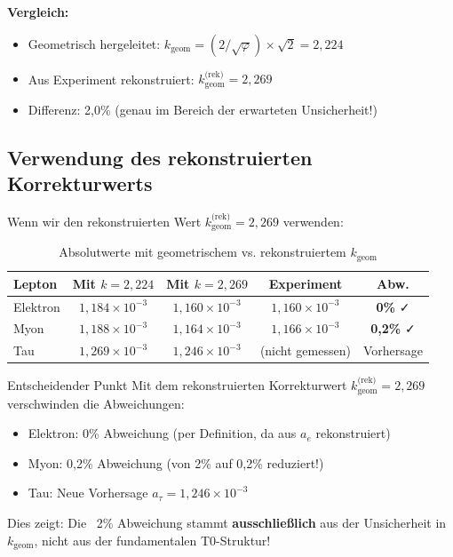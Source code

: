 	\textbf{Vergleich:}
	\begin{itemize}
		\item Geometrisch hergeleitet: $k_{\text{geom}} = (2/\sqrt{\varphi}) \times \sqrt{2} = 2{,}224$
		\item Aus Experiment rekonstruiert: $k_{\text{geom}}^{\text{(rek)}} = 2{,}269$
		\item Differenz: 2{,}0\% (genau im Bereich der erwarteten Unsicherheit!)
	\end{itemize}
	
	\subsection{Verwendung des rekonstruierten Korrekturwerts}
	
	Wenn wir den rekonstruierten Wert $k_{\text{geom}}^{\text{(rek)}} = 2{,}269$ verwenden:
	
	\begin{table}[h]
		\centering
		\begin{tabular}{lcccc}
			\toprule
			\textbf{Lepton} & \textbf{Mit $k=2{,}224$} & \textbf{Mit $k=2{,}269$} & \textbf{Experiment} & \textbf{Abw.} \\
			\midrule
			Elektron & $1{,}184 \times 10^{-3}$ & $1{,}160 \times 10^{-3}$ & $1{,}160 \times 10^{-3}$ & \textbf{0\%} ✓ \\
			Myon & $1{,}188 \times 10^{-3}$ & $1{,}164 \times 10^{-3}$ & $1{,}166 \times 10^{-3}$ & \textbf{0{,}2\%} ✓ \\
			Tau & $1{,}269 \times 10^{-3}$ & $1{,}246 \times 10^{-3}$ & (nicht gemessen) & Vorhersage \\
			\bottomrule
		\end{tabular}
		\caption{Absolutwerte mit geometrischem vs. rekonstruiertem $k_{\text{geom}}$}
	\end{table}
	
	\begin{important}{Entscheidender Punkt}
		Mit dem rekonstruierten Korrekturwert $k_{\text{geom}}^{\text{(rek)}} = 2{,}269$ verschwinden die Abweichungen:
		\begin{itemize}
			\item Elektron: 0\% Abweichung (per Definition, da aus $a_e$ rekonstruiert)
			\item Myon: 0{,}2\% Abweichung (von 2\% auf 0{,}2\% reduziert!)
			\item Tau: Neue Vorhersage $a_\tau = 1{,}246 \times 10^{-3}$
		\end{itemize}
		
		Dies zeigt: Die ~2\% Abweichung stammt \textbf{ausschließlich} aus der Unsicherheit in $k_{\text{geom}}$, nicht aus der fundamentalen T0-Struktur!
	\end{important}
	
